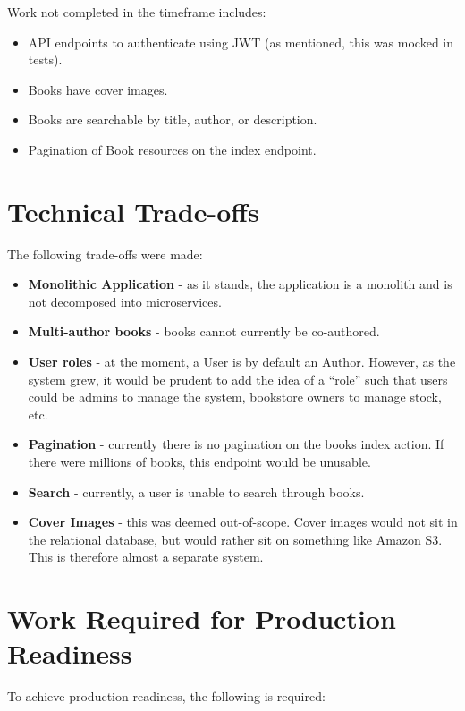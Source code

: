 \documentclass[a4paper]{article}
\begin{document}
Work not completed in the timeframe includes:

\begin{itemize}
  \item API endpoints to authenticate using JWT (as mentioned, this was mocked
  in tests).
  \item Books have cover images.
  \item Books are searchable by title, author, or description.
  \item Pagination of Book resources on the index endpoint.
\end{itemize}

\section{Technical Trade-offs}
\label{sec:trade_offs}

The following trade-offs were made:

\begin{itemize}
  \item \textbf{Monolithic Application} - as it stands, the application is a
  monolith and is not decomposed into microservices.
  \item \textbf{Multi-author books} - books cannot currently be co-authored.
  \item \textbf{User roles} - at the moment, a User is by default an Author. However, as
  the system grew, it would be prudent to add the idea of a ``role'' such that
  users could be admins to manage the system, bookstore owners to manage stock,
  etc.
  \item \textbf{Pagination} - currently there is no pagination on the books
  index action. If there were millions of books, this endpoint would be unusable.
  \item \textbf{Search} - currently, a user is unable to search through books.
  \item \textbf{Cover Images} - this was deemed out-of-scope. Cover images would
  not sit in the relational database, but would rather sit on something like
  Amazon S3. This is therefore almost a separate system.
\end{itemize}

\section{Work Required for Production Readiness}
\label{sec:production}

To achieve production-readiness, the following is required:
\end{document}

